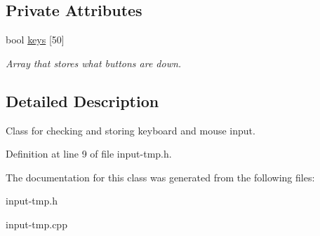 \subsection*{Private Attributes}
\begin{DoxyCompactItemize}
\item 
bool \hyperlink{classInput_abb6decf78aac69a63afc06677b1fbdba}{keys} \mbox{[}50\mbox{]}\hypertarget{classInput_abb6decf78aac69a63afc06677b1fbdba}{}\label{classInput_abb6decf78aac69a63afc06677b1fbdba}

\begin{DoxyCompactList}\small\item\em Array that stores what buttons are down. \end{DoxyCompactList}\end{DoxyCompactItemize}


\subsection{Detailed Description}
Class for checking and storing keyboard and mouse input. 

Definition at line 9 of file input-\/tmp.\+h.



The documentation for this class was generated from the following files\+:\begin{DoxyCompactItemize}
\item 
input-\/tmp.\+h\item 
input-\/tmp.\+cpp\end{DoxyCompactItemize}
